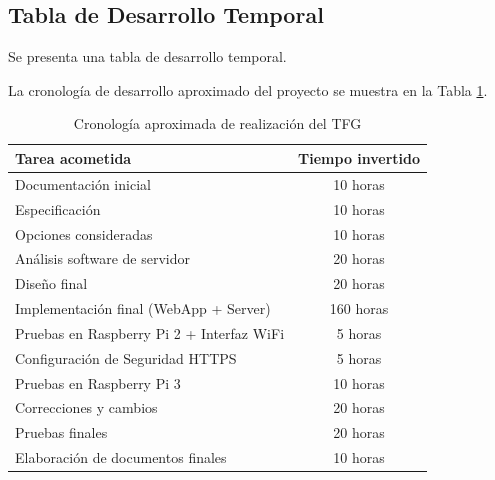 \begin{appendices}
\cleardoublepage
{}%
\begin{center}
\begin{minipage}{.75\textwidth}
\section{Tabla de Desarrollo Temporal}\label{ApendiceF}

Se presenta una tabla de desarrollo temporal.
\end{minipage}
\end{center}
\clearpage%

La cronología de desarrollo aproximado del proyecto se muestra en la Tabla \ref{tablaTFG}.

\begin{table}[!ht]
\begin{center}
\begin{tabular}{ | l | c | }
\hline
\textbf{Tarea acometida} & \textbf{Tiempo invertido} \\
\hline
Documentación inicial & 10 horas \\ \hline
Especificación & 10 horas \\ \hline
Opciones consideradas & 10 horas \\ \hline
Análisis software de servidor & 20 horas \\ \hline
Diseño final & 20 horas \\ \hline
Implementación final (WebApp + Server) & 160 horas \\ \hline
Pruebas en Raspberry Pi 2 + Interfaz WiFi & 5 horas \\ \hline
Configuración de Seguridad HTTPS & 5 horas \\ \hline
Pruebas en Raspberry Pi 3 & 10 horas \\ \hline
Correcciones y cambios & 20 horas \\ \hline
Pruebas finales & 20 horas \\ \hline
Elaboración de documentos finales & 10 horas \\ \hline
\end{tabular}
\end{center}
\caption{Cronología aproximada de realización del TFG}
\label{tablaTFG}
\end{table}%

\end{appendices}